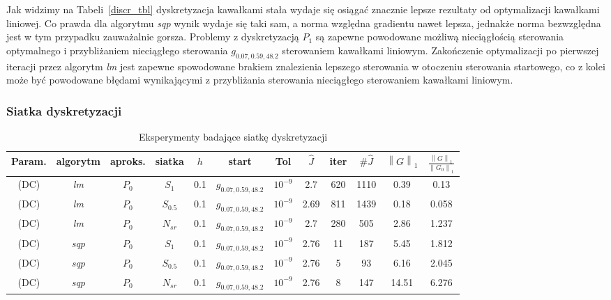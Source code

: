 \documentclass[11pt]{article}
\newcommand{\norm}[1]{\left\lVert#1\right\rVert}
\begin{document}
Jak widzimy na Tabeli~\ref{discr_tbl} dyskretyzacja kawałkami stała wydaje się osiągać znacznie lepsze rezultaty od optymalizacji kawałkami liniowej. Co prawda dla algorytmu {\it sqp\/} wynik wydaje się taki sam, a norma względna gradientu nawet lepsza, jednakże norma bezwzględna jest w tym przypadku zauważalnie gorsza. Problemy z dyskretyzacją $P_1$ są zapewne powodowane możliwą nieciągłością sterowania optymalnego i przybliżaniem nieciągłego sterowania $g_{0.07,0.59,48.2}$ sterowaniem kawałkami liniowym. Zakończenie optymalizacji po pierwszej iteracji przez algorytm {\it lm\/} jest zapewne spowodowane brakiem znalezienia lepszego sterowania w otoczeniu sterowania startowego, co z kolei może być powodowane błędami wynikającymi z przybliżania sterowania nieciągłego sterowaniem kawałkami liniowym.

\subsubsection{Siatka dyskretyzacji}

\begin{table}[h!]
  \begin{center}
    \begin{tabular}{|c|c|c|c|c|c|c||c|c|c|c|c|}
      \hline
      Param. & algorytm & aproks. & siatka & $h$ & start & Tol & $\hat{J}$ & iter & $\#\hat{J}$ & $\norm{G}_1$ & $\frac{\norm{G}_1}{\norm{G_0}_1}$ \\
      \hline
      (DC) & {\it lm\/} & $P_0$ & $S_1$ & 0.1 & $g_{0.07,0.59,48.2}$ & $10^{-9}$ & 2.7 & 620 & 1110 & 0.39 & 0.13 \\
      \hline
      (DC) & {\it lm\/} & $P_0$ & $S_{0.5}$ & 0.1 & $g_{0.07,0.59,48.2}$ & $10^{-9}$ & 2.69 & 811 & 1439 & 0.18 & 0.058 \\
      \hline
      (DC) & {\it lm\/} & $P_0$ & $N_{sr}$ & 0.1 & $g_{0.07,0.59,48.2}$ & $10^{-9}$ & 2.7 & 280 & 505 & 2.86 & 1.237 \\
      \hline
      (DC) & {\it sqp\/} & $P_0$ & $S_1$ & 0.1 & $g_{0.07,0.59,48.2}$ & $10^{-9}$ & 2.76 & 11 & 187 & 5.45 & 1.812 \\
      \hline
      (DC) & {\it sqp\/} & $P_0$ & $S_{0.5}$ & 0.1 & $g_{0.07,0.59,48.2}$ & $10^{-9}$ & 2.76 & 5 & 93 & 6.16 & 2.045 \\
      \hline
      (DC) & {\it sqp\/} & $P_0$ & $N_{sr}$ & 0.1 & $g_{0.07,0.59,48.2}$ & $10^{-9}$ & 2.76 & 8 & 147 & 14.51 & 6.276 \\
      \hline
    \end{tabular}
    \caption{Eksperymenty badające siatkę dyskretyzacji}\label{grid_tbl}
  \end{center}
\end{table}
\end{document}
